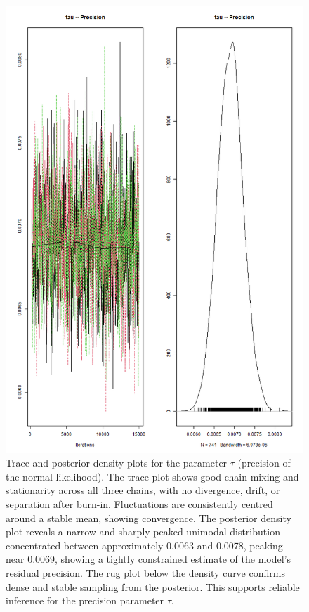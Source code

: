 \documentclass[]{article}
\begin{document}
\begin{figure}[H]
	\centering
	\includegraphics[width=0.7\linewidth]{img/img-trace-tao}
	\caption{Trace and posterior density plots for the parameter $\tau$ (precision of the normal likelihood). The trace plot shows good chain mixing and stationarity across all three chains, with no divergence, drift, or separation after burn-in. Fluctuations are consistently centred around a stable mean, showing convergence. The posterior density plot reveals a narrow and sharply peaked unimodal distribution concentrated between approximately 0.0063 and 0.0078, peaking near 0.0069, showing a tightly constrained estimate of the model’s residual precision. The rug plot below the density curve confirms dense and stable sampling from the posterior. This supports reliable inference for the precision parameter $\tau$.}
	\label{fig:img-trace-tao}
\end{figure}
\end{document}
